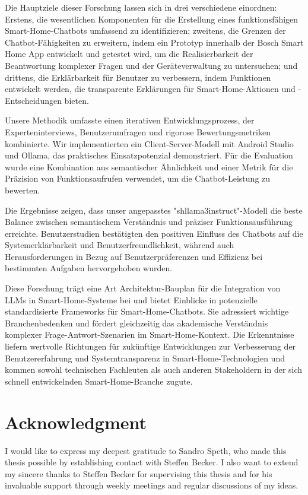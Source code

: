 \documentclass[
  a4paper,  %
  twoside,  %
  bibliography=totoc,
  headsepline,
  cleardoublepage=empty,
  parskip=half,
  draft=false
]{scrbook}
\begin{document}
Die Hauptziele dieser Forschung lassen sich in drei verschiedene einordnen: Erstens, die wesentlichen Komponenten für die Erstellung eines funktionsfähigen Smart-Home-Chatbots umfassend zu identifizieren; zweitens, die Grenzen der Chatbot-Fähigkeiten zu erweitern, indem ein Prototyp innerhalb der Bosch Smart Home App entwickelt und getestet wird, um die Realisierbarkeit der Beantwortung komplexer Fragen und der Geräteverwaltung zu untersuchen; und drittens, die Erklärbarkeit für Benutzer zu verbessern, indem Funktionen entwickelt werden, die transparente Erklärungen für Smart-Home-Aktionen und -Entscheidungen bieten.

Unsere Methodik umfasste einen iterativen Entwicklungsprozess, der Experteninterviews, Benutzerumfragen und rigorose Bewertungsmetriken kombinierte. Wir implementierten ein Client-Server-Modell mit Android Studio und Ollama, das praktisches Einsatzpotenzial demonstriert. Für die Evaluation wurde eine Kombination aus semantischer Ähnlichkeit und einer Metrik für die Präzision von Funktionsaufrufen verwendet, um die Chatbot-Leistung zu bewerten.

Die Ergebnisse zeigen, dass unser angepasstes "shllama3instruct"-Modell die beste Balance zwischen semantischem Verständnis und präziser Funktionsausführung erreichte. Benutzerstudien bestätigten den positiven Einfluss des Chatbots auf die Systemerklärbarkeit und Benutzerfreundlichkeit, während auch Herausforderungen in Bezug auf Benutzerpräferenzen und Effizienz bei bestimmten Aufgaben hervorgehoben wurden.

Diese Forschung trägt eine Art Architektur-Bauplan für die Integration von LLMs in Smart-Home-Systeme bei und bietet Einblicke in potenzielle standardisierte Frameworks für Smart-Home-Chatbots. Sie adressiert wichtige Branchenbedenken und fördert gleichzeitig das akademische Verständnis komplexer Frage-Antwort-Szenarien im Smart-Home-Kontext. Die Erkenntnisse liefern wertvolle Richtungen für zukünftige Entwicklungen zur Verbesserung der Benutzererfahrung und Systemtransparenz in Smart-Home-Technologien und kommen sowohl technischen Fachleuten als auch anderen Stakeholdern in der sich schnell entwickelnden Smart-Home-Branche zugute.
\cleardoublepage


\section*{Acknowledgment}
I would like to express my deepest gratitude to Sandro Speth, who made this thesis possible by establishing contact with Steffen Becker. I also want to extend my sincere thanks to Steffen Becker for supervising this thesis and for his invaluable support through weekly meetings and regular discussions of my ideas.
\end{document}

